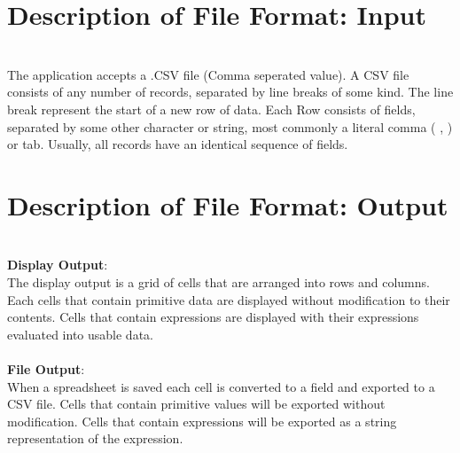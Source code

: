 \documentclass[12pt]{article}
\begin{document}
\appendix

\section{Description of File Format: Input}
\noindent\\
The application accepts a .CSV file (Comma seperated value).  A CSV file consists of any number of records, separated by line breaks of some kind. The line break represent the start of a new row of data. Each Row consists of fields, separated by some other character or string, most commonly a literal comma ( , ) or tab. Usually, all records have an identical sequence of fields.

\section{Description of File Format: Output}
\noindent\\
{\bf Display Output}: \\The display output is a grid of cells that are arranged into rows and columns. Each cells that contain primitive data are displayed without modification to their contents. Cells that contain expressions are displayed with their expressions evaluated into usable data.
\noindent\\\\
{\bf File Output}:\\When a spreadsheet is saved each cell is converted to a field and exported to a CSV file. Cells that contain primitive values will be exported without modification. Cells that contain expressions will be exported as a string representation of the expression.\\
\end{document}
